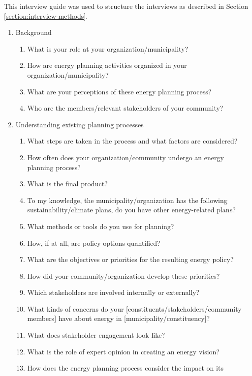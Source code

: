 This interview guide was used to structure the interviews as described in
Section \ref{section:interview-methods}.

\begin{enumerate}
    \item Background
    \begin{enumerate}
        \item What is your role at your organization/municipality?
        \item How are energy planning activities organized in your
        organization/municipality?
        \item What are your perceptions of these energy planning process?
        \item Who are the members/relevant stakeholders of your community?
    \end{enumerate}
    \item Understanding existing planning processes
    \begin{enumerate}
        \item What steps are taken in the process and what factors are
        considered?
        \item How often does your organization/community undergo an energy
        planning process?
        \item What is the final product?
        \item To my knowledge, the municipality/organization has the following
        sustainability/climate plans, do you have other energy-related plans?
        \item What methods or tools do you use for planning?
        \item How, if at all, are policy options quantified?
        \item What are the objectives or priorities for the resulting energy
        policy?
        \item How did your community/organization develop these priorities?
        \item Which stakeholders are involved internally or externally?
        \item What kinds of concerns do your
        [constituents/stakeholders/community members] have about energy in
        [municipality/constituency]?
        \item What does stakeholder engagement look like?
        \item What is the role of expert opinion in creating an energy vision?
        \item How does the energy planning process consider the impact on its

\end{enumerate}
\end{enumerate}

